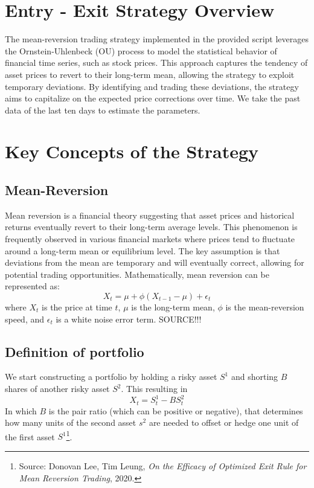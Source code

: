 \documentclass{article}
\begin{document}
\section{Entry - Exit Strategy Overview}
The mean-reversion trading strategy implemented in the provided script leverages the Ornstein-Uhlenbeck (OU) process to model the statistical behavior of financial time series, such as stock prices. This approach captures the tendency of asset prices to revert to their long-term mean, allowing the strategy to exploit temporary deviations. By identifying and trading these deviations, the strategy aims to capitalize on the expected price corrections over time.
We take the past data of the last ten days to estimate the parameters.

\section*{Key Concepts of the Strategy}
\subsection*{Mean-Reversion}
Mean reversion is a financial theory suggesting that asset prices and historical returns eventually revert to their long-term average levels. This phenomenon is frequently observed in various financial markets where prices tend to fluctuate around a long-term mean or equilibrium level. The key assumption is that deviations from the mean are temporary and will eventually correct, allowing for potential trading opportunities. Mathematically, mean reversion can be represented as:
\begin{equation}
X_t = \mu + \phi (X_{t-1} - \mu) + \epsilon_t
\end{equation}
where \( X_t \) is the price at time \( t \), \( \mu \) is the long-term mean, \( \phi \) is the mean-reversion speed, and \( \epsilon_t \) is a white noise error term.
SOURCE!!!

\subsection*{Definition of portfolio}
We start constructing a portfolio by holding a risky asset $S^1$ and shorting $B$ shares of another risky asset $S^2$. This resulting in
\begin{equation}
    X_t=S_t^1-BS_t^2
\end{equation}
In which $B$ is the pair ratio (which can be positive or negative), that determines how many units of the second asset $s^2$ are needed to offset or hedge one unit of the first asset $S^1$\footnote{Source: Donovan Lee, Tim Leung, \textit{On the Efficacy of Optimized Exit Rule for Mean Reversion Trading}, 2020.}.\\
\end{document}
